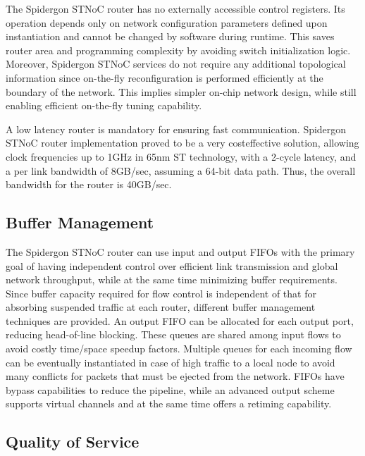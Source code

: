 The Spidergon STNoC router has no externally accessible control registers. 
Its operation depends only on network configuration parameters defined upon instantiation and cannot be changed by software during runtime. 
This saves router area and programming complexity by avoiding switch initialization logic. 
Moreover, Spidergon STNoC services do not require any additional topological information since on-the-fly reconfiguration is performed efficiently at the boundary of the network. 
This implies simpler on-chip network design, while still enabling efficient on-the-fly tuning capability.

A low latency router is mandatory for ensuring fast communication. 
Spidergon STNoC router implementation proved to be a very costeffective solution, allowing clock frequencies up to 1GHz in 65nm ST technology, with a 2-cycle latency, and a per link bandwidth of 8GB/sec, assuming a 64-bit data path. Thus, the overall bandwidth for the router is 40GB/sec.~\cite{coppola2008design}

\subsection{Buffer Management}\label{S:buffer}

The Spidergon STNoC router can use input and output FIFOs with the primary goal of having independent control over efficient link transmission and global network throughput, while at the same time minimizing buffer requirements. 
Since buffer capacity required for flow control is independent of that for absorbing suspended traffic at each router, different buffer management techniques are provided. 
An output FIFO can be allocated for each output port, reducing head-of-line blocking. 
These queues are shared among input flows to avoid costly time/space speedup factors. 
Multiple queues for each incoming flow can be eventually instantiated in case of high traffic to a local node to avoid many conflicts for packets that must be ejected from the network. 
FIFOs have bypass capabilities to reduce the pipeline, while an advanced output scheme supports virtual channels and at the same time offers a retiming capability.

\subsection{Quality of Service}\label{S:qos}

